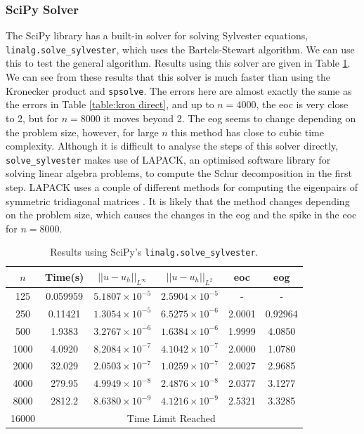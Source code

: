 \documentclass[11pt]{article}
\numberwithin{equation}{section}
\begin{document}
\subsubsection*{SciPy Solver}
The SciPy library has a built-in solver for solving Sylvester equations, \texttt{linalg.solve\_sylvester}, which uses the Bartels-Stewart algorithm. We can use this to test the general algorithm. Results using this solver are given in Table \ref{table:bartels scipy}. We can see from these results that this solver is much faster than using the Kronecker product and \texttt{spsolve}. The errors here are almost exactly the same as the errors in Table \ref{table:kron direct}, and up to $n=4000$, the eoc is very close to 2, but for $n=8000$ it moves beyond 2. The eog seems to change depending on the problem size, however, for large $n$ this method has close to cubic time complexity. Although it is difficult to analyse the steps of this solver directly, \texttt{solve\_sylvester} makes use of LAPACK, an optimised software library for solving linear algebra problems, to compute the Schur decomposition in the first step. LAPACK uses a couple of different methods for computing the eigenpairs of symmetric tridiagonal matrices \cite{Demmel}. It is likely that the method changes depending on the problem size, which causes the changes in the eog and the spike in the eoc for $n=8000$. 

\begin{table}[H]
\centering
\begin{tabular}{|c|c|c|c|c|c|}
\hline
$n$ & Time(s) & $|| u - u_h ||_{L^{\infty}}$ &$|| u - u_h ||_{L^{2}}$ & eoc & eog \\
\hline
125 & 0.059959 & $5.1807 \times 10^{-5}$ & $2.5904 \times 10^{-5}$ & - & - \\
250 & 0.11421 & $1.3054 \times 10^{-5}$ & $6.5275 \times 10^{-6}$ & 2.0001 & 0.92964 \\
500 & 1.9383 & $3.2767 \times 10^{-6}$ & $1.6384 \times 10^{-6}$ & 1.9999 & 4.0850  \\
1000 & 4.0920 & $8.2084 \times 10^{-7}$ & $4.1042 \times 10^{-7}$ & 2.0000 & 1.0780 \\
2000 & 32.029 & $2.0503 \times 10^{-7}$ & $1.0259 \times 10^{-7}$ & 2.0027 & 2.9685  \\
4000 & 279.95 & $4.9949 \times 10^{-8}$ & $2.4876 \times 10^{-8}$ & 2.0377 & 3.1277  \\
8000 & 2812.2 & $8.6380 \times 10^{-9}$ & $4.1216 \times 10^{-9}$ & 2.5321 & 3.3285 \\
\cline{2-6}
16000 & \multicolumn{5}{c|}{Time Limit Reached} \\
\hline
\end{tabular}
\caption{Results using SciPy's \texttt{linalg.solve\_sylvester}.}
\label{table:bartels scipy}
\end{table}
\end{document}
